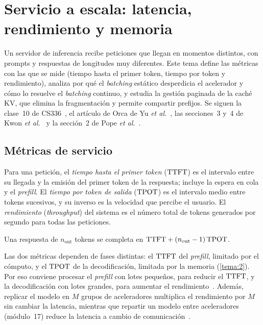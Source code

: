 \chapter{Servicio a escala: latencia, rendimiento y memoria}
\label{tema:6}

Un servidor de inferencia recibe peticiones que llegan en momentos distintos, con prompts y respuestas de longitudes muy diferentes. Este tema define las métricas con las que se mide (tiempo hasta el primer token, tiempo por token y rendimiento), analiza por qué el \emph{batching} estático desperdicia el acelerador y cómo lo resuelve el \emph{batching} continuo, y estudia la gestión paginada de la caché KV, que elimina la fragmentación y permite compartir prefijos. Se siguen la clase~10 de CS336~\cite{cs336}, el artículo de Orca de Yu \emph{et al.}~\cite{orca}, las secciones~3 y~4 de Kwon \emph{et al.}~\cite{kwon} y la sección~2 de Pope \emph{et al.}~\cite{pope}.

\section{Métricas de servicio}

\begin{definicion}\label{def:metricas}
Para una petición, el \emph{tiempo hasta el primer token} ($\mathrm{TTFT}$) es el intervalo entre su llegada y la emisión del primer token de la respuesta; incluye la espera en cola y el \emph{prefill}. El \emph{tiempo por token de salida} ($\mathrm{TPOT}$) es el intervalo medio entre tokens sucesivos, y su inverso es la velocidad que percibe el usuario. El \emph{rendimiento} (\emph{throughput}) del sistema es el número total de tokens generados por segundo para todas las peticiones.
\end{definicion}

\begin{proposicion}\label{prop:latencia}
Una respuesta de $n_{\mathrm{out}}$ tokens se completa en $\mathrm{TTFT}+(n_{\mathrm{out}}-1)\,\mathrm{TPOT}$.
\end{proposicion}

\addtocounter{definicion}{1}%

Las dos métricas dependen de fases distintas: el $\mathrm{TTFT}$ del \emph{prefill}, limitado por el cómputo, y el $\mathrm{TPOT}$ de la decodificación, limitada por la memoria (\cref{tema:2}). Por eso conviene procesar el \emph{prefill} con lotes pequeños, para reducir el $\mathrm{TTFT}$, y la decodificación con lotes grandes, para aumentar el rendimiento~\cite{cs336}. Además, replicar el modelo en $M$ grupos de aceleradores multiplica el rendimiento por $M$ sin cambiar la latencia, mientras que repartir un modelo entre aceleradores (módulo~17) reduce la latencia a cambio de comunicación~\cite{cs336,pope}.


